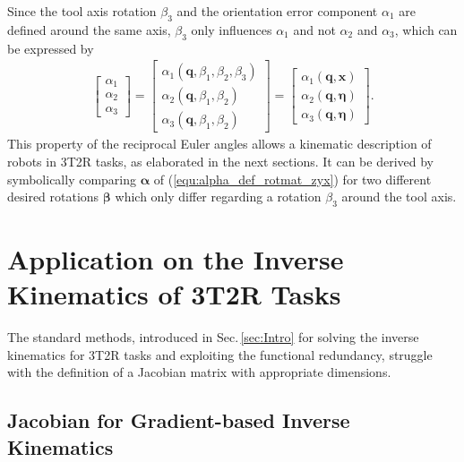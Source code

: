 \documentclass{svproc}
\newcommand{\bm}[1]{\boldsymbol{#1}}
\begin{document}
Since the tool axis rotation $\beta_3$ and the orientation error component $\alpha_1$ are defined around the same axis, $\beta_3$ only influences $\alpha_1$ and not $\alpha_2$ and $\alpha_3$, which can be expressed by
%
\begin{align}
\begin{bmatrix}
\alpha_1 \\
\alpha_2 \\
\alpha_3
\end{bmatrix}
=
\begin{bmatrix}
\alpha_1(\bm{q},\beta_1,\beta_2,\beta_3) \\
\alpha_2(\bm{q},\beta_1,\beta_2) \\
\alpha_3(\bm{q},\beta_1,\beta_2)
\end{bmatrix}
=
\begin{bmatrix}
\alpha_1(\bm{q},\bm{x}) \\
\alpha_2(\bm{q},\bm{\eta}) \\
\alpha_3(\bm{q},\bm{\eta}) 
\end{bmatrix}
\label{equ:alpha_dep_beta}.
\end{align}
%
This property of the reciprocal Euler angles allows a kinematic description of robots in 3T2R tasks, as elaborated in the next sections.
It can be derived by symbolically comparing $\bm{\alpha}$ of (\ref{equ:alpha_def_rotmat_zyx}) for two different desired rotations $\bm{\beta}$ which only differ regarding a rotation $\beta_3$ around the tool axis.

\section{Application on the Inverse Kinematics of 3T2R Tasks}
\label{sec:RecEulAng_3T2R_app}

The standard methods, introduced in Sec.\,\ref{sec:Intro} for solving the inverse kinematics for 3T2R tasks and exploiting the functional redundancy, struggle with the definition of a Jacobian matrix with appropriate dimensions.

\subsection{Jacobian for Gradient-based Inverse Kinematics}
\end{document}

